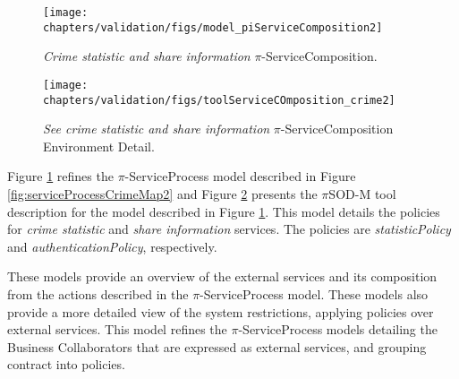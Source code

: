 \begin{figure}[ht!]   
\centering
\texttt{[image: chapters/validation/figs/model\_piServiceComposition2]}
\caption{\textit{Crime statistic and share information}
$\pi$-ServiceComposition.}
\label{fig:serviceCompositionCrimeMap2}
\end{figure}    

\begin{figure}[ht!]    
\centering
\texttt{[image: chapters/validation/figs/toolServiceCOmposition\_crime2]}
\caption{\textit{See crime statistic and share information}
$\pi$-ServiceComposition Environment Detail.}
\label{fig:toolserviceCompositionCrimeMap2}
\end{figure}   

Figure \ref{fig:serviceCompositionCrimeMap2} refines the $\pi$-ServiceProcess
model described in Figure \ref{fig:serviceProcessCrimeMap2} and Figure
\ref{fig:toolserviceCompositionCrimeMap2} presents the $\pi$SOD-M tool
description for the model described in Figure
\ref{fig:serviceCompositionCrimeMap2}. This model details the policies for
\textit{crime statistic} and \textit{share information} services. The
policies are \textit{statisticPolicy} and \textit{authenticationPolicy},
respectively. 

These models provide an overview of the external services and its composition
from the actions described in the $\pi$-ServiceProcess model. These models also
provide a more detailed view of the system restrictions, applying policies
over external services. This model refines the $\pi$-ServiceProcess models
detailing the Business Collaborators that are expressed as external services,
and grouping contract into policies. 




